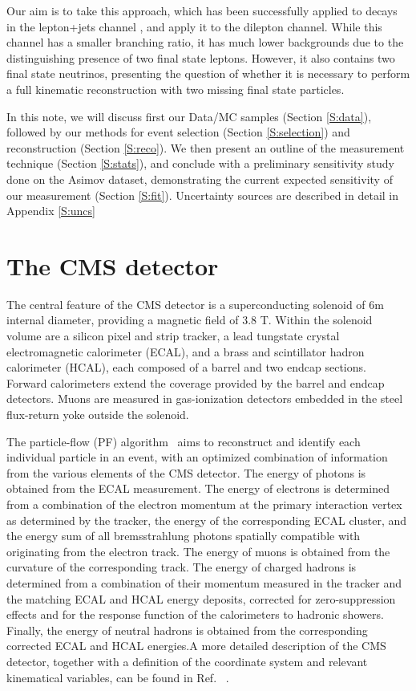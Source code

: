 Our aim is to take this approach, which has been successfully applied to \ttbar decays in the lepton+jets channel \cite{ytpaper}, and apply it to the dilepton channel. While this channel has a smaller branching ratio, it has much lower backgrounds due to the distinguishing presence of two final state leptons. However, it also contains two final state neutrinos, presenting the question of whether it is necessary to perform a full kinematic reconstruction with two missing final state particles. 

In this note, we will discuss first our Data/MC samples (Section \ref{S:data}), followed by our methods for event selection (Section \ref{S:selection}) and reconstruction (Section \ref{S:reco}). We then present an outline of the measurement technique (Section \ref{S:stats}), and conclude with a preliminary sensitivity study done on the Asimov dataset, demonstrating the current expected sensitivity of our measurement (Section \ref{S:fit}). 
Uncertainty sources are described in detail in Appendix \ref{S:uncs}

\clearpage


\section{The CMS detector}
\label{sec:detector}
The central feature of the CMS detector is a superconducting solenoid of 6m internal diameter,
providing a magnetic field of 3.8 T. Within the solenoid volume are a silicon pixel and strip
tracker, a lead tungstate crystal electromagnetic calorimeter (ECAL), and a brass and scintillator
hadron calorimeter (HCAL), each composed of a barrel and two endcap sections. Forward calorimeters
extend the coverage provided by the barrel and endcap detectors. Muons
are measured in gas-ionization detectors embedded in the steel flux-return yoke outside the
solenoid. 

The particle-flow (PF) algorithm~\cite{CMS-PRF-14-001} aims to reconstruct and identify each individual particle in an event, with an optimized combination of information from the various elements of the CMS detector. The energy of photons is obtained from the ECAL measurement. The energy of electrons is determined from a combination of the electron momentum at the primary interaction vertex as determined by the tracker, the energy of the corresponding ECAL cluster, and the energy sum of all bremsstrahlung photons spatially compatible with originating from the electron track. The energy of muons is obtained from the curvature of the corresponding track. The energy of charged hadrons is determined from a combination of their momentum measured in the tracker and the matching ECAL and HCAL energy deposits, corrected for zero-suppression effects and for the response function of the calorimeters to hadronic showers. Finally, the energy of neutral hadrons is obtained from the corresponding corrected ECAL and HCAL energies.A more detailed description of the CMS detector, together with a definition of the
coordinate system and relevant kinematical variables, can be found in Ref. ~\cite{Chatrchyan:2008zzk}.

